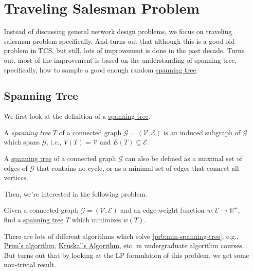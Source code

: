 \chapter{Traveling Salesman Problem}
Instead of discussing general network design problems, we focus on traveling salesman problem specifically. And turns out that although this is a good old problem in TCS, but still, lots of improvement is done in the past decade. Turns out, most of the improvement is based on the understanding of spanning tree, specifically, how to sample a good enough random \hyperref[def:spanning-tree]{spanning tree}.

\section{Spanning Tree}
We first look at the definition of a \hyperref[def:spanning-tree]{spanning tree}.

\begin{definition}\label{def:spanning-tree}
	A \emph{spanning tree} \(T\) of a connected graph \(\mathcal{G}=(\mathcal{V} , \mathcal{E} )\) is an induced subgraph of \(\mathcal{G} \) which spans \(\mathcal{G} \), i.e., \(V(T) = \mathcal{V}\) and \(E(T) \subseteq \mathcal{E} \).
\end{definition}

\begin{remark}
	A \hyperref[def:spanning-tree]{spanning tree} of a connected graph \(\mathcal{G} \) can also be defined as a maximal set of edges of \(\mathcal{G} \) that contains no cycle, or as a minimal set of edges that connect all vertices.
\end{remark}

Then, we're interested in the following problem.

\begin{problem}\label{prb:min-spanning-tree}
Given a connected graph \(\mathcal{G} =(\mathcal{V} , \mathcal{E} )\) and an edge-weight function \(w\colon \mathcal{E} \to \mathbb{R} ^+\), find a \hyperref[def:spanning-tree]{spanning tree} \(T\) which minimizes \(w(T)\).
\end{problem}

There are lots of different algorithms which solve \autoref{prb:min-spanning-tree}, e.g., \href{https://en.wikipedia.org/wiki/Prim%27s_algorithm}{Prim's algorithm}, \href{https://en.wikipedia.org/wiki/Kruskal%27s_algorithm}{Kruskal's Algorithm}, etc. in undergraduate algorithm courses. But turns out that by looking at the LP formulation of this problem, we get some non-trivial result. 


